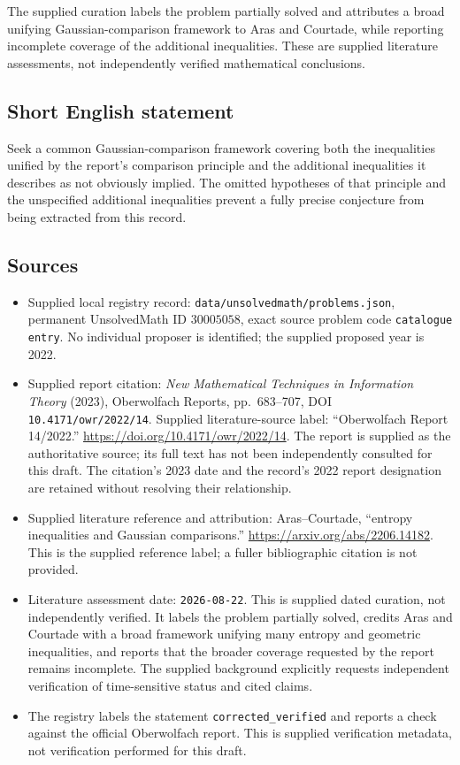 \documentclass[11pt]{article}
\begin{document}
The supplied curation labels the problem partially solved and attributes a broad unifying Gaussian-comparison framework to Aras and Courtade, while reporting incomplete coverage of the additional inequalities. These are supplied literature assessments, not independently verified mathematical conclusions.
\subsection{Short English statement}
Seek a common Gaussian-comparison framework covering both the inequalities unified by the report's comparison principle and the additional inequalities it describes as not obviously implied. The omitted hypotheses of that principle and the unspecified additional inequalities prevent a fully precise conjecture from being extracted from this record.
\subsection{Sources}
\begin{itemize}
\item Supplied local registry record: \texttt{data/unsolvedmath/problems.json}, permanent UnsolvedMath ID \(30005058\), exact source problem code \texttt{catalogue entry}. No individual proposer is identified; the supplied proposed year is 2022.
\item Supplied report citation: \emph{New Mathematical Techniques in Information Theory} (2023), Oberwolfach Reports, pp.\ 683--707, DOI \texttt{10.4171/owr/2022/14}. Supplied literature-source label: ``Oberwolfach Report 14/2022.'' \url{https://doi.org/10.4171/owr/2022/14}. The report is supplied as the authoritative source; its full text has not been independently consulted for this draft. The citation's 2023 date and the record's 2022 report designation are retained without resolving their relationship.
\item Supplied literature reference and attribution: Aras--Courtade, ``entropy inequalities and Gaussian comparisons.'' \url{https://arxiv.org/abs/2206.14182}. This is the supplied reference label; a fuller bibliographic citation is not provided.
\item Literature assessment date: \texttt{2026-08-22}. This is supplied dated curation, not independently verified. It labels the problem partially solved, credits Aras and Courtade with a broad framework unifying many entropy and geometric inequalities, and reports that the broader coverage requested by the report remains incomplete. The supplied background explicitly requests independent verification of time-sensitive status and cited claims.
\item The registry labels the statement \texttt{corrected\_verified} and reports a check against the official Oberwolfach report. This is supplied verification metadata, not verification performed for this draft.
\end{itemize}
\end{document}
